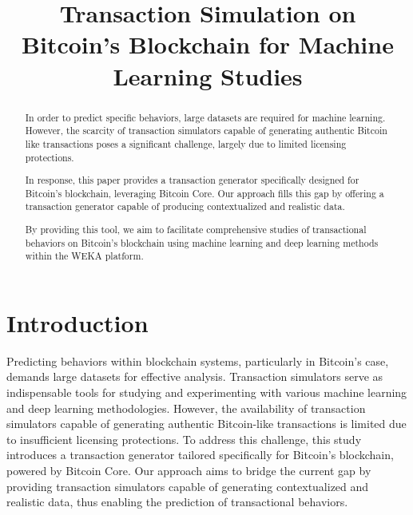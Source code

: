 \documentclass[conference]{IEEEtran}
\begin{document}
\title{Transaction Simulation on Bitcoin's Blockchain for Machine Learning Studies}

\author{
}

\maketitle

\begin{abstract}
In order to predict specific behaviors, large datasets are required for machine learning. However, the scarcity of transaction simulators capable of generating authentic Bitcoin\cite{nakamoto2008bitcoin} like transactions poses a significant challenge, largely due to limited licensing protections. 

In response, this paper provides a transaction generator specifically designed for Bitcoin's blockchain, leveraging Bitcoin Core\cite{bitcoincore}. Our approach fills this gap by offering a transaction generator capable of producing contextualized and realistic data. 

By providing this tool, we aim to facilitate comprehensive studies of transactional behaviors on Bitcoin's blockchain using machine learning and deep learning methods within the WEKA platform\cite{weka}.
\end{abstract}

\thispagestyle{firstpagefooter}

\section{Introduction}

Predicting behaviors within blockchain systems, particularly in Bitcoin's case, demands large datasets for effective analysis. Transaction simulators serve as indispensable tools for studying and experimenting with various machine learning and deep learning methodologies. However, the availability of transaction simulators capable of generating authentic Bitcoin-like transactions is limited due to insufficient licensing protections. To address this challenge, this study introduces a transaction generator tailored specifically for Bitcoin's blockchain, powered by Bitcoin Core. Our approach aims to bridge the current gap by providing transaction simulators capable of generating contextualized and realistic data, thus enabling the prediction of transactional behaviors.
\end{document}
